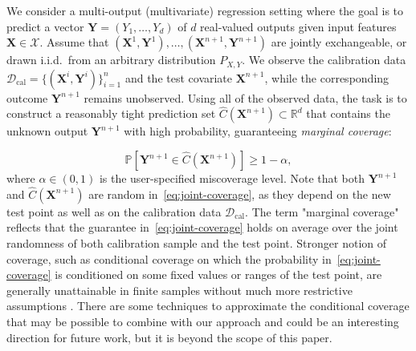 {\color{blue} We consider a multi-output (multivariate) regression setting where the
goal is to predict a vector
$\mathbf{Y}=(Y_1,\ldots,Y_d)$ of $d$ real-valued outputs given input
features $\mathbf{X}\in\mathcal{X}$.
Assume that
$(\mathbf{X}^1,\mathbf{Y}^1),\ldots,(\mathbf{X}^{n+1},\mathbf{Y}^{n+1})$ are jointly exchangeable, or drawn
i.i.d.\ from an arbitrary distribution $P_{X,Y}$. We observe the
calibration data $\mathcal D_{\mathrm{cal}}=\{(\mathbf{X}^i,\mathbf{Y}^i)\}_{i=1}^n$
and the test covariate $\mathbf{X}^{n+1}$, while the corresponding outcome
$\mathbf{Y}^{n+1}$ remains unobserved.
Using all of the observed data, the task is to construct a reasonably tight prediction set $\hat{C}(\mathbf{X}^{n+1}) \subset \mathbb{R}^d$ that contains the unknown output $\mathbf{Y}^{n+1}$ with high probability, guaranteeing \emph{marginal coverage}:

\begin{equation}
\mathbb{P}\!\left[ \mathbf{Y}^{n+1} \in \hat{C}(\mathbf{X}^{n+1}) \right] \ge 1 - \alpha,
\label{eq:joint-coverage}
\end{equation}
where $\alpha \in (0,1)$ is the user-specified miscoverage level.  
Note that both $\mathbf{Y}^{n+1}$ and $\hat{C}(\mathbf{X}^{n+1})$ are random in~\eqref{eq:joint-coverage}, as they depend on the new test point as well as on the calibration data $\mathcal{D}_{\mathrm{cal}}$.  
The term "marginal coverage" reflects that the guarantee in~\eqref{eq:joint-coverage} holds on average over the joint randomness of both calibration sample and the test point. Stronger notion of coverage, such as conditional coverage on which the probability in~\eqref{eq:joint-coverage} is conditioned on some fixed values or ranges of the test point, are generally unattainable in finite samples without much more restrictive assumptions \citep{foygel2021limits}. There are some techniques to approximate the conditional coverage \citep{Romano2020With,gibbs2025conformal} that may be possible to combine with our approach and could be an interesting direction for future work, but it is beyond the scope of this paper.}

